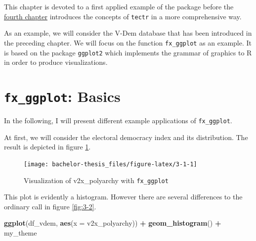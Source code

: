 \documentclass[]{report}
\newenvironment{Shaded}{\begin{snugshade}}{\end{snugshade}}
\newcommand{\KeywordTok}[1]{\textcolor[rgb]{0.13,0.29,0.53}{\textbf{#1}}}
\newcommand{\DataTypeTok}[1]{\textcolor[rgb]{0.13,0.29,0.53}{#1}}
\newcommand{\StringTok}[1]{\textcolor[rgb]{0.31,0.60,0.02}{#1}}
\newcommand{\CommentTok}[1]{\textcolor[rgb]{0.56,0.35,0.01}{\textit{#1}}}
\newcommand{\OperatorTok}[1]{\textcolor[rgb]{0.81,0.36,0.00}{\textbf{#1}}}
\newcommand{\NormalTok}[1]{#1}
\theoremstyle{definition}
\theoremstyle{definition}
\theoremstyle{definition}
\theoremstyle{remark}
\begin{document}
This chapter is devoted to a first applied example of the package before
the \protect\hyperlink{concept}{fourth chapter} introduces the concepts
of \texttt{tectr} in a more comprehensive way.

As an example, we will consider the V-Dem database that has been
introduced in the preceding chapter. We will focus on the function
\texttt{fx\_ggplot} as an example. It is based on the package
\texttt{ggplot2} which implements the grammar of graphics to R in order
to produce visualizations. \citep{ggplot}

\section{\texorpdfstring{\texttt{fx\_ggplot}:
Basics}{fx\_ggplot: Basics}}\label{fx_ggplot-basics}

In the following, I will present different example applications of
\texttt{fx\_ggplot}.

At first, we will consider the electoral democracy index and its
distribution. The result is depicted in figure \ref{fig:3-1}.

\begin{Shaded}
\end{Shaded}

\begin{figure}

{\centering \texttt{[image: bachelor-thesis\_files/figure-latex/3-1-1]} 

}

\caption{Visualization of v2x\_polyarchy with \texttt{fx\_ggplot}}\label{fig:3-1}
\end{figure}



This plot is evidently a histogram. However there are several
differences to the ordinary call in figure \ref{fig:3-2}.

\begin{Shaded}
\begin{Highlighting}[]
\KeywordTok{ggplot}\NormalTok{(df_vdem, }\KeywordTok{aes}\NormalTok{(}\DataTypeTok{x =}\NormalTok{ v2x_polyarchy)) }\OperatorTok{+}\StringTok{ }
\StringTok{  }\KeywordTok{geom_histogram}\NormalTok{() }\OperatorTok{+}\StringTok{ }
\StringTok{  }\NormalTok{my_theme}
\end{Highlighting}
\end{Shaded}
\end{document}
